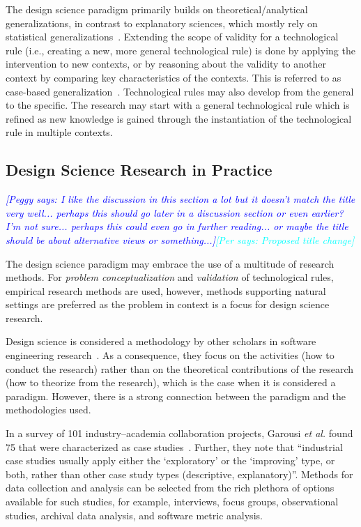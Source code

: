 \documentclass[graybox]{svmult}
\newcommand{\peggy}[1]{\textcolor{blue}{{\it [Peggy says: #1]}}}
\newcommand{\per}[1]{\textcolor{cyan}{{\it [Per says: #1]}}}
\newcommand{\peggy}[1]{}
\newcommand{\per}[1]{}
\begin{document}
The design science paradigm primarily builds on theoretical/analytical generalizations, in contrast to explanatory sciences, which mostly rely on statistical generalizations~\cite[p. 30]{Runeson12Case}. Extending the scope of validity for a technological rule (i.e., creating a new, more general technological rule) is done by applying the intervention to new contexts, or by reasoning about the validity to another context by comparing key characteristics of the contexts. This is referred to as case-based generalization~\cite{wieringa_six_2015}.  
Technological rules may also develop from the general to the specific. The research may start with a general technological rule which is refined as new knowledge is gained through the instantiation of the technological rule in multiple contexts. 


\subsection{Design Science Research in Practice} 
\peggy{I like the discussion in this section a lot but it doesn't match the title very well...  perhaps this should go later in a discussion section or even earlier? I'm not sure... perhaps this could even go in further reading... or maybe the title should be about alternative views or something...}\per{Proposed title change}

The design science paradigm may embrace the use of a multitude of research methods. For \emph{problem conceptualization} and \emph{validation} of technological rules, empirical research methods are used, however, methods supporting natural settings are preferred as the problem in context is a focus for design science research. 

Design science is considered a methodology by other scholars in software engineering research~\cite{Wohlin2015}. As a consequence, they focus on the %
activities (how to conduct the research) rather than on the theoretical contributions of the research (how to theorize from the research), which is the case when it is considered a paradigm. However, %
there is a strong connection between the paradigm and the methodologies used.%


In a survey of 101 industry--academia collaboration projects, Garousi \emph{et al.} found 75 that were characterized as case studies~\cite{Garousi2019}. Further, they note that ``industrial case studies usually apply either the `exploratory' or the `improving' type, or both, rather than other case study types (descriptive, explanatory)''. Methods for data collection and analysis can be selected from the rich plethora of options available for such studies, for example, interviews, focus groups, observational studies, archival data analysis, and software metric analysis. 
\end{document}
